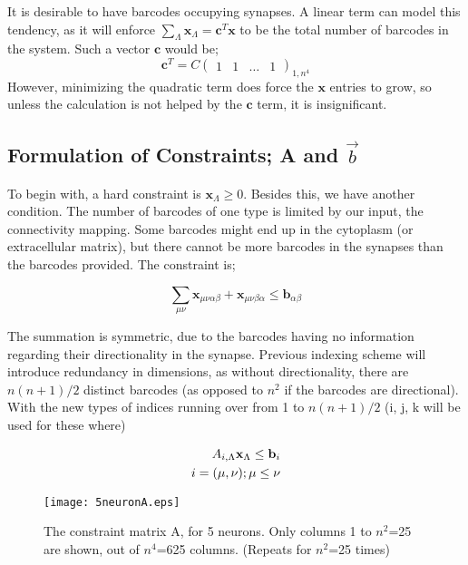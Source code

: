 \documentclass[%
 reprint,
 amsmath,amssymb,
 aps,
]{revtex4-1}
\begin{document}
It is desirable to have barcodes occupying synapses. A linear term can model this tendency, as it will enforce $\sum_{\Lambda} \mathbf{x}_\Lambda = \mathbf{c}^T \mathbf{x}$ to be the total number of barcodes in the system. Such a vector $\mathbf{c}$ would be;
\begin{equation}
	\mathbf{c}^T = C
	\begin{pmatrix}
		1 & 1 & \dots & 1
	\end{pmatrix}_{1,n^4}
\end{equation}
However, minimizing the quadratic term does force the $\mathbf{x}$ entries to grow, so unless the calculation is not helped by the $\mathbf{c}$ term, it is insignificant.

\subsection{\label{sec2:A}Formulation of Constraints; A and $\vec{b}$}

To begin with, a hard constraint is $\mathbf{x}_{\Lambda} \geq 0$. Besides this, we have another condition. The number of barcodes of one type is limited by our input, the connectivity mapping. Some barcodes might end up in the cytoplasm (or extracellular matrix), but there cannot be more barcodes in the synapses than the barcodes provided. The constraint is;

\begin{equation}
	\sum_{\mu\nu} \mathbf{x}_{\mu\nu\alpha\beta} + \mathbf{x}_{\mu\nu\beta\alpha} \leq \mathbf{b}_{\alpha\beta}
\end{equation}

The summation is symmetric, due to the barcodes having no information regarding their directionality in the synapse. Previous indexing scheme will introduce redundancy in dimensions, as without directionality, there are $n(n+1)/2$ distinct barcodes (as opposed to $n^2$ if the barcodes are directional). With the new types of indices running over from 1 to $n(n+1)/2$ (i, j, k will be used for these where)

\begin{equation}
	\begin{aligned}
		A_{i,\Lambda} \mathbf{x}_{\Lambda} \leq \mathbf{b}_i \\
		i = (\mu,\nu); \space \mu \leq \nu
	\end{aligned}
\end{equation}

\begin{figure}[!ht]
	\centering
	\texttt{[image: 5neuronA.eps]}
	\caption{The constraint matrix A, for 5 neurons. Only columns 1 to $n^2$=25 are shown, out of $n^4$=625 columns. (Repeats for $n^2$=25 times)}
\end{figure}
\end{document}
